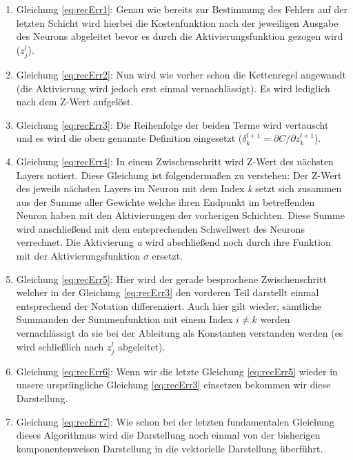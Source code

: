 \begin{enumerate}

\item Gleichung \ref{eq:recErr1}: Genau wie bereits zur Bestimmung des Fehlers auf der letzten Schicht wird hierbei die Kostenfunktion nach der jeweiligen Ausgabe des Neurons abgeleitet bevor es durch die Aktivierungsfunktion gezogen wird ($z^l_j$). 

\item Gleichung \ref{eq:recErr2}: Nun wird wie vorher schon die Kettenregel angewandt (die Aktivierung wird jedoch erst einmal vernachlässigt). Es wird lediglich nach dem Z-Wert aufgelöst.

\item Gleichung \ref{eq:recErr3}: Die Reihenfolge der beiden Terme wird vertauscht und es wird die oben genannte Definition eingesetzt ($\delta^{l+1}_k = \partial C / \partial z^{l+1}_k$). 

\item Gleichung \ref{eq:recErr4}: In einem Zwischenschritt wird Z-Wert des nächsten Layers notiert. Diese Gleichung ist folgendermaßen zu verstehen: Der Z-Wert des jeweils nächsten Layers im Neuron mit dem Index \emph{k} setzt sich zusammen aus der Summe aller Gewichte welche ihren Endpunkt im betreffenden Neuron haben mit den Aktivierungen der vorherigen Schichten. Diese Summe wird anschließend mit dem entsprechenden Schwellwert des Neurons verrechnet. Die Aktivierung \emph{a} wird abschließend noch durch ihre Funktion mit der Aktivierungsfunktion $\sigma$ ersetzt. 

\item Gleichung \ref{eq:recErr5}: Hier wird der gerade besprochene Zwischenschritt welcher in der Gleichung \ref{eq:recErr3} den vorderen Teil darstellt einmal entsprechend der Notation differenziert. Auch hier gilt wieder, sämtliche Summanden der Summenfunktion mit einem Index $i \neq k$ werden vernachlässigt da sie bei der Ableitung als Konstanten verstanden werden (es wird schließlich nach $z^l_j$ abgeleitet). 

\item Gleichung \ref{eq:recErr6}: Wenn wir die letzte Gleichung \ref{eq:recErr5} wieder in unsere ursprüngliche Gleichung \ref{eq:recErr3} einsetzen bekommen wir diese Darstellung. 

\item Gleichung \ref{eq:recErr7}: Wie schon bei der letzten fundamentalen Gleichung dieses Algorithmus wird die Darstellung noch einmal von der bisherigen komponentenweisen Darstellung in die vektorielle Darstellung überführt. 

\end{enumerate}
